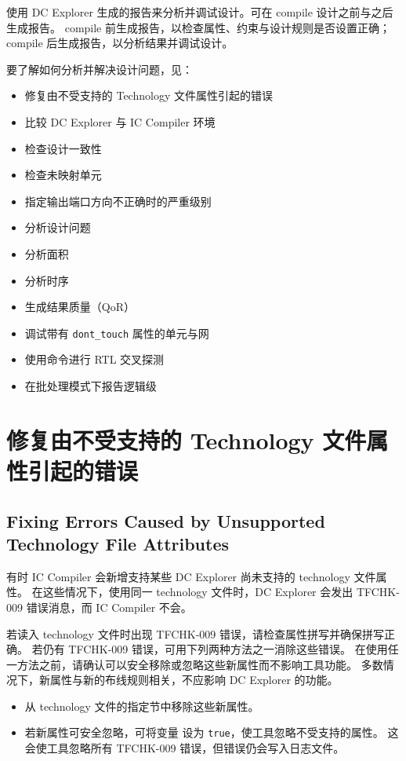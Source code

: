 \label{chap:analyze}

使用 DC Explorer 生成的报告来分析并调试设计。可在 compile 设计之前与之后生成报告。
compile 前生成报告，以检查属性、约束与设计规则是否设置正确；compile 后生成报告，以分析结果并调试设计。

要了解如何分析并解决设计问题，见：
\begin{itemize}
  \item 修复由不受支持的 Technology 文件属性引起的错误
  \item 比较 DC Explorer 与 IC Compiler 环境
  \item 检查设计一致性
  \item 检查未映射单元
  \item 指定输出端口方向不正确时的严重级别
  \item 分析设计问题
  \item 分析面积
  \item 分析时序
  \item 生成结果质量（QoR）
  \item 调试带有 \texttt{dont\_touch} 属性的单元与网
  \item 使用命令进行 RTL 交叉探测
  \item 在批处理模式下报告逻辑级
\end{itemize}

\section{修复由不受支持的 Technology 文件属性引起的错误}
\subsection*{Fixing Errors Caused by Unsupported Technology File Attributes}

有时 IC Compiler 会新增支持某些 DC Explorer 尚未支持的 technology 文件属性。
在这些情况下，使用同一 technology 文件时，DC Explorer 会发出 TFCHK-009 错误消息，而 IC Compiler 不会。

若读入 technology 文件时出现 TFCHK-009 错误，请检查属性拼写并确保拼写正确。
若仍有 TFCHK-009 错误，可用下列两种方法之一消除这些错误。
在使用任一方法之前，请确认可以安全移除或忽略这些新属性而不影响工具功能。
多数情况下，新属性与新的布线规则相关，不应影响 DC Explorer 的功能。
\begin{itemize}
  \item 从 technology 文件的指定节中移除这些新属性。
  \item 若新属性可安全忽略，可将变量  设为 \texttt{true}，使工具忽略不受支持的属性。
        这会使工具忽略所有 TFCHK-009 错误，但错误仍会写入日志文件。
\end{itemize}

